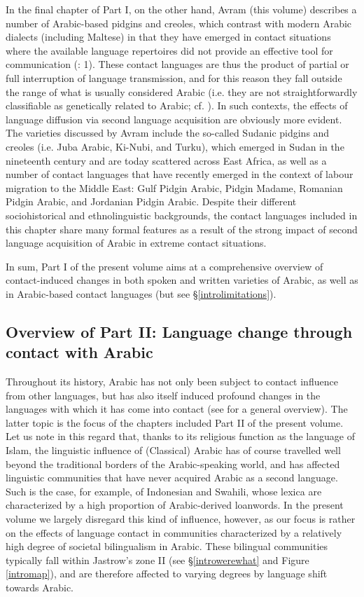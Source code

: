 \documentclass[output=paper]{langsci/langscibook}
\begin{document}
In the final chapter of Part I, on the other hand, Avram (this volume) describes a number of Arabic-based pidgins and creoles, which contrast with modern Arabic dialects (including Maltese) in that they have emerged in contact situations where the available language repertoires did not provide an effective tool for communication (\citealt{BakkerMatras2013intro}: 1). These contact languages are thus the product of partial or full interruption of language transmission, and for this reason they fall outside the range of what is usually considered Arabic (i.e. they are not straightforwardly classifiable as genetically related to Arabic; cf. \citealt{McMahon2013}). In such contexts, the effects of language diffusion via second language acquisition are obviously more evident. The varieties discussed by Avram include the so-called Sudanic pidgins and creoles (i.e. Juba Arabic, Ki-Nubi, and Turku), which emerged in Sudan in the nineteenth century and are today scattered across East Africa, as well as a number of contact languages that have recently emerged in the context of labour migration to the Middle East: Gulf Pidgin Arabic, Pidgin Madame, Romanian Pidgin Arabic, and Jordanian Pidgin Arabic. Despite their different sociohistorical and ethnolinguistic backgrounds, the contact languages included in this chapter share many formal features as a result of the strong impact of second language acquisition of Arabic in extreme contact situations.

In sum, Part I of the present volume aims at a comprehensive overview of contact-induced changes in both spoken and written varieties of Arabic, as well as in Arabic-based contact languages (but see §\ref{introlimitations}).

\subsection{Overview of Part II: Language change through contact
with Arabic}

Throughout its history, Arabic has not only been subject to contact influence from other languages, but has also itself induced profound changes in the languages with which it has come into contact (see \citealt{Versteegh2001article} for a general overview). The latter topic is the focus of the chapters included Part II of the present volume. Let us note in this regard that, thanks to its religious function as the language of Islam, the linguistic influence of (Classical) Arabic has of course travelled well beyond the traditional borders of the Arabic-speaking world, and has affected linguistic communities that have never acquired Arabic as a second language. Such is the case, for example, of Indonesian and Swahili, whose lexica are characterized by a high proportion of Arabic-derived loanwords. In the present volume we largely disregard this kind of influence, however, as our focus is rather on the effects of language contact in communities characterized by a relatively high degree of societal bilingualism in Arabic. These bilingual communities typically fall within Jastrow’s zone II (see §\ref{introwerewhat} and Figure \ref{intromap}), and are therefore affected to varying degrees by language shift towards Arabic. 
\end{document}
